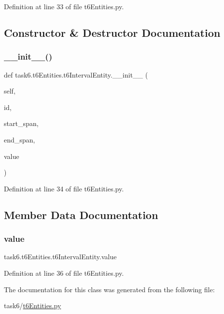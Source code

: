 Definition at line 33 of file t6\+Entities.\+py.



\subsection{Constructor \& Destructor Documentation}
\mbox{\label{classtask6_1_1t6Entities_1_1t6IntervalEntity_a1ac32d786c2759c6886bcde28846eb0d}} 
\subsubsection{\texorpdfstring{\+\_\+\+\_\+init\+\_\+\+\_\+()}{\_\_init\_\_()}}
{\footnotesize\ttfamily def task6.\+t6\+Entities.\+t6\+Interval\+Entity.\+\_\+\+\_\+init\+\_\+\+\_\+ (\begin{DoxyParamCaption}\item[{}]{self,  }\item[{}]{id,  }\item[{}]{start\+\_\+span,  }\item[{}]{end\+\_\+span,  }\item[{}]{value }\end{DoxyParamCaption})}



Definition at line 34 of file t6\+Entities.\+py.



\subsection{Member Data Documentation}
\mbox{\label{classtask6_1_1t6Entities_1_1t6IntervalEntity_a002714e201e05948aca8cce83d4a9da6}} 
\subsubsection{\texorpdfstring{value}{value}}
{\footnotesize\ttfamily task6.\+t6\+Entities.\+t6\+Interval\+Entity.\+value}



Definition at line 36 of file t6\+Entities.\+py.



The documentation for this class was generated from the following file\+:\begin{DoxyCompactItemize}
\item 
task6/\hyperlink{t6Entities_8py}{t6\+Entities.\+py}\end{DoxyCompactItemize}
